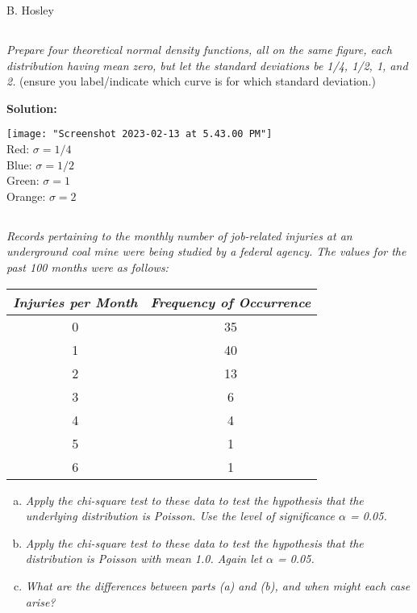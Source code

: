 \documentclass[12pt]{amsart}
\begin{document}
\raggedbottom

\hspace{\fill} {\large B. Hosley}
\bigskip


\setcounter{section}{9}
\setcounter{subsection}{5}
\subsection{} %
\textit{Prepare four theoretical normal density functions, 
		all on the same figure, each distribution having mean zero, 
		but let the standard deviations be 1/4, 1/2, 1, and 2.}
		(ensure you label/indicate which curve is for which standard deviation.)
		
		\bigskip
		\textbf{Solution:}
	
	\texttt{[image: "Screenshot 2023-02-13 at 5.43.00 PM"]}\\
	
	\noindent
	Red: \(\sigma=1/4\) \\
	Blue: \(\sigma=1/2\) \\
	Green: \(\sigma=1\) \\
	Orange: \(\sigma=2\) \\
	
\setcounter{subsection}{15}
\subsection{} %
	\textit{Records pertaining to the monthly number of job-related injuries 
		at an underground coal mine were being studied by a federal agency. 
		The values for the past 100 months were as follows:} \\
	\begin{center}
		\begin{tabular}{cc}
			\toprule
			\textit{Injuries per Month} & \textit{Frequency of Occurrence} \\
			\midrule
			0 & 35 \\
			1 & 40 \\
			2 & 13 \\
			3 & 6 \\
			4 & 4 \\
			5 & 1 \\
			6 & 1 \\
			\bottomrule
		\end{tabular}
	\end{center}
	\begin{enumerate}[(a)]
		\item \textit{Apply the chi-square test to these data to test the hypothesis that the underlying distribution is Poisson. Use the level of significance \(\alpha\) = 0.05.}
		\item \textit{Apply the chi-square test to these data to test the hypothesis that the distribution is Poisson with mean 1.0. Again let \(\alpha\) = 0.05.}
		\item \textit{What are the differences between parts (a) and (b), and when might each case arise?}
	\end{enumerate}
\end{document}
